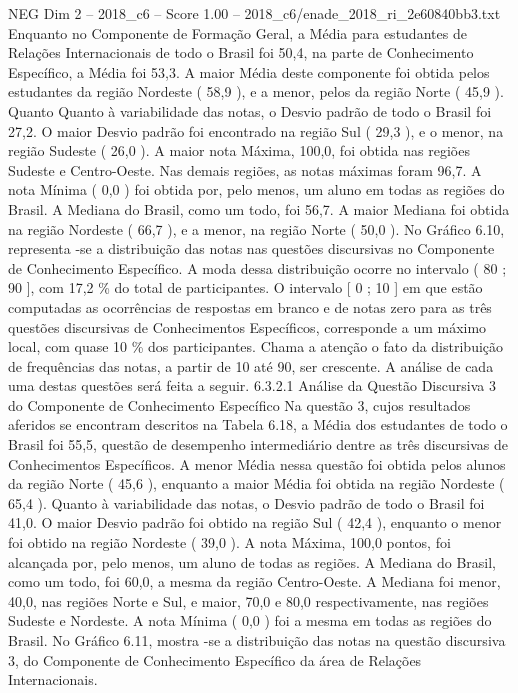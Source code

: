 \begin{textsample}{NEG Dim 2 – 2018\_c6 – Score 1.00 – 2018\_c6/enade\_2018\_ri\_2e60840bb3.txt}
Enquanto no Componente de Formação Geral, a Média para estudantes de Relações Internacionais de todo o Brasil foi 50,4, na parte de Conhecimento Específico, a Média foi 53,3.
A maior Média deste componente foi obtida pelos estudantes da região Nordeste ( 58,9 ), e a menor, pelos da região Norte ( 45,9 ).
Quanto Quanto à variabilidade das notas, o Desvio padrão de todo o Brasil foi 27,2.
O maior Desvio padrão foi encontrado na região Sul ( 29,3 ), e o menor, na região Sudeste ( 26,0 ).
A maior nota Máxima, 100,0, foi obtida nas regiões Sudeste e Centro-Oeste.
Nas demais regiões, as notas máximas foram 96,7.
A nota Mínima ( 0,0 ) foi obtida por, pelo menos, um aluno em todas as regiões do Brasil.
A Mediana do Brasil, como um todo, foi 56,7.
A maior Mediana foi obtida na região Nordeste ( 66,7 ), e a menor, na região Norte ( 50,0 ).
No Gráfico 6.10, representa -se a distribuição das notas nas questões discursivas no Componente de Conhecimento Específico.
A moda dessa distribuição ocorre no intervalo ( 80 ; 90 ], com 17,2 \% do total de participantes.
O intervalo [ 0 ; 10 ] em que estão computadas as ocorrências de respostas em branco e de notas zero para as três questões discursivas de Conhecimentos Específicos, corresponde a um máximo local, com quase 10 \% dos participantes.
Chama a atenção o fato da distribuição de frequências das notas, a partir de 10 até 90, ser crescente.
A análise de cada uma destas questões será feita a seguir. 6.3.2.1 Análise da Questão Discursiva 3 do Componente de Conhecimento Específico Na questão 3, cujos resultados aferidos se encontram descritos na Tabela 6.18, a Média dos estudantes de todo o Brasil foi 55,5, questão de desempenho intermediário dentre as três discursivas de Conhecimentos Específicos.
A menor Média nessa questão foi obtida pelos alunos da região Norte ( 45,6 ), enquanto a maior Média foi obtida na região Nordeste ( 65,4 ).
Quanto à variabilidade das notas, o Desvio padrão de todo o Brasil foi 41,0.
O maior Desvio padrão foi obtido na região Sul ( 42,4 ), enquanto o menor foi obtido na região Nordeste ( 39,0 ).
A nota Máxima, 100,0 pontos, foi alcançada por, pelo menos, um aluno de todas as regiões.
A Mediana do Brasil, como um todo, foi 60,0, a mesma da região Centro-Oeste.
A Mediana foi menor, 40,0, nas regiões Norte e Sul, e maior, 70,0 e 80,0 respectivamente, nas regiões Sudeste e Nordeste.
A nota Mínima ( 0,0 ) foi a mesma em todas as regiões do Brasil.
No Gráfico 6.11, mostra -se a distribuição das notas na questão discursiva 3, do Componente de Conhecimento Específico da área de Relações Internacionais.

\end{textsample}
